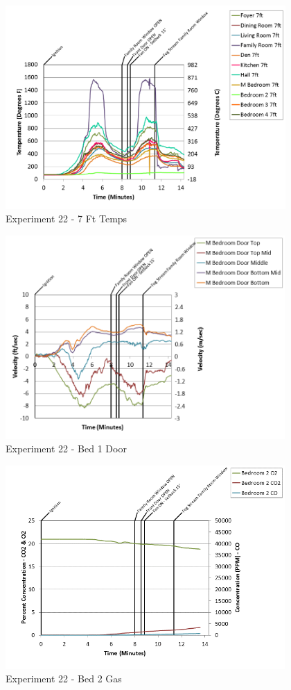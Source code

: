 \documentclass{article}
\begin{document}
\begin{appendices}
\begin{figure}[h!]
	\centering
	\includegraphics[height=3.05in]{0_Images/Results_Charts/Exp_22_Charts/7FtTemps.png}
	\caption{Experiment 22 - 7 Ft Temps}
\end{figure}

\clearpage

\begin{figure}[h!]
	\centering
	\includegraphics[height=3.05in]{0_Images/Results_Charts/Exp_22_Charts/Bed1Door.png}
	\caption{Experiment 22 - Bed 1 Door}
\end{figure}


\begin{figure}[h!]
	\centering
	\includegraphics[height=3.05in]{0_Images/Results_Charts/Exp_22_Charts/Bed2Gas.png}
	\caption{Experiment 22 - Bed 2 Gas}
\end{figure}


\end{appendices}
\end{document}
